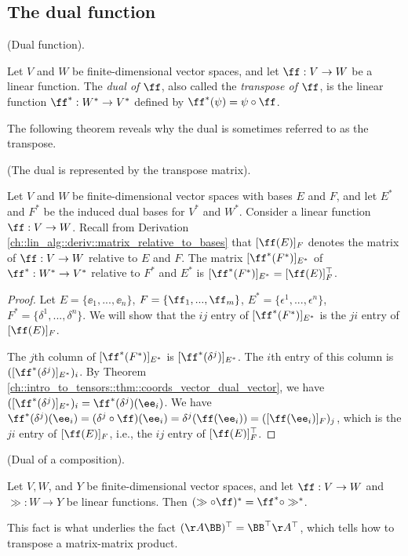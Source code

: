 \subsection*{The dual function}

\begin{defn}
\label{ch::motivated_intro::defn::dual_transf}
    (Dual function).
    
    Let $V$ and $W$ be finite-dimensional vector spaces, and let $\ff:V \rightarrow W$ be a linear function.
    The \textit{dual of $\ff$}, also called the \textit{transpose of $\ff$}, is the linear function $\ff^*:W^* \rightarrow V^*$ defined by $\ff^*(\psi) = \psi \circ \ff$.
\end{defn}

The following theorem reveals why the dual is sometimes referred to as the transpose.

\begin{theorem}
    (The dual is represented by the transpose matrix).

    Let $V$ and $W$ be finite-dimensional vector spaces with bases $E$ and $F$, and let $E^*$ and $F^*$ be the induced dual bases for $V^*$ and $W^*$. Consider a linear function $\ff:V \rightarrow W$. Recall from Derivation \ref{ch::lin_alg::deriv::matrix_relative_to_bases} that $[\ff(E)]_F$ denotes the matrix of $\ff:V \rightarrow W$ relative to $E$ and $F$. The matrix $[\ff^*(F^*)]_{E^*}$ of $\ff^*:W^* \rightarrow V^*$ relative to $F^*$ and $E^*$ is $[\ff^*(F^*)]_{E^*} = [\ff(E)]_F^{\top}$.
\end{theorem}

\begin{proof}
    Let $E = \{\ee_1, ..., \ee_n\}$, $F = \{\ff_1, ..., \ff_m\}$, $E^* = \{\epsilon^1, ..., \epsilon^n\}$, $F^* = \{\delta^1, ..., \delta^n\}$. We will show that the $ij$ entry of $[\ff^*(F^*)]_{E^*}$ is the $ji$ entry of $[\ff(E)]_F$.
    
    The $j$th column of $[\ff^*(F^*)]_{E^*}$ is $[\ff^*(\delta^j)]_{E^*}$. The $i$th entry of this column is $([\ff^*(\delta^j)]_{E^*})_i$. By Theorem \ref{ch::intro_to_tensors::thm::coords_vector_dual_vector}, we have $([\ff^*(\delta^j)]_{E^*})_i = \ff^*(\delta^j)(\ee_i)$. We have $\ff^*(\delta^j)(\ee_i) = (\delta^j \circ \ff)(\ee_i) = \delta^j(\ff(\ee_i)) = ([\ff(\ee_i)]_F)_j$, which is the $ji$ entry of $[\ff(E)]_F$, i.e., the $ij$ entry of $[\ff(E)]_F^\top$.
\end{proof}

\begin{theorem}
     (Dual of a composition).
     
     Let $V, W$, and $Y$ be finite-dimensional vector spaces, and let $\ff:V \rightarrow W$ and $\gg:W \rightarrow Y$ be linear functions. Then $(\gg \circ \ff)^* = \ff^* \circ \gg^*$. 
     
     This fact is what underlies the fact $(\AA \BB)^\top = \BB^\top \AA^\top$, which tells how to transpose a matrix-matrix product.
\end{theorem}

